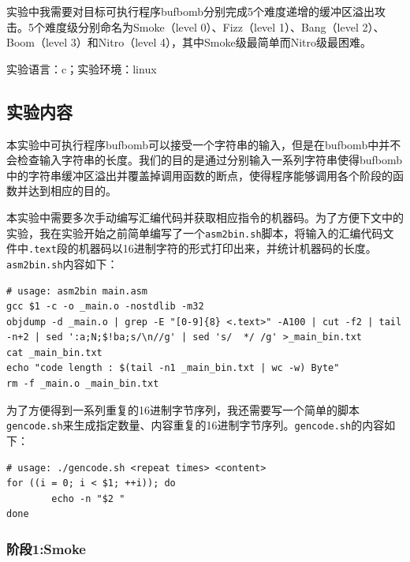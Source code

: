 \documentclass{paper}
\begin{document}
实验中我需要对目标可执行程序bufbomb分别完成5个难度递增的缓冲区溢出攻击。5个难度级分别命名为Smoke（level 0）、Fizz（level 1）、Bang（level 2）、Boom（level 3）和Nitro（level 4），其中Smoke级最简单而Nitro级最困难。

实验语言：c；实验环境：linux

\subsection{实验内容}

本实验中可执行程序bufbomb可以接受一个字符串的输入，但是在bufbomb中并不会检查输入字符串的长度。我们的目的是通过分别输入一系列字符串使得bufbomb中的字符串缓冲区溢出并覆盖掉调用函数的断点，使得程序能够调用各个阶段的函数并达到相应的目的。

本实验中需要多次手动编写汇编代码并获取相应指令的机器码。为了方便下文中的实验，我在实验开始之前简单编写了一个\verb|asm2bin.sh|脚本，将输入的汇编代码文件中\verb|.text|段的机器码以16进制字符的形式打印出来，并统计机器码的长度。\verb|asm2bin.sh|内容如下：
\begin{lstlisting}
# usage: asm2bin main.asm
gcc $1 -c -o _main.o -nostdlib -m32
objdump -d _main.o | grep -E "[0-9]{8} <.text>" -A100 | cut -f2 | tail -n+2 | sed ':a;N;$!ba;s/\n//g' | sed 's/  */ /g' >_main_bin.txt
cat _main_bin.txt
echo "code length : $(tail -n1 _main_bin.txt | wc -w) Byte"
rm -f _main.o _main_bin.txt
\end{lstlisting}

为了方便得到一系列重复的16进制字节序列，我还需要写一个简单的脚本\verb|gencode.sh|来生成指定数量、内容重复的16进制字节序列。\verb|gencode.sh|的内容如下：
\begin{lstlisting}
# usage: ./gencode.sh <repeat times> <content>
for ((i = 0; i < $1; ++i)); do
        echo -n "$2 "
done
\end{lstlisting}

\subsubsection{阶段1:Smoke}
\end{document}
